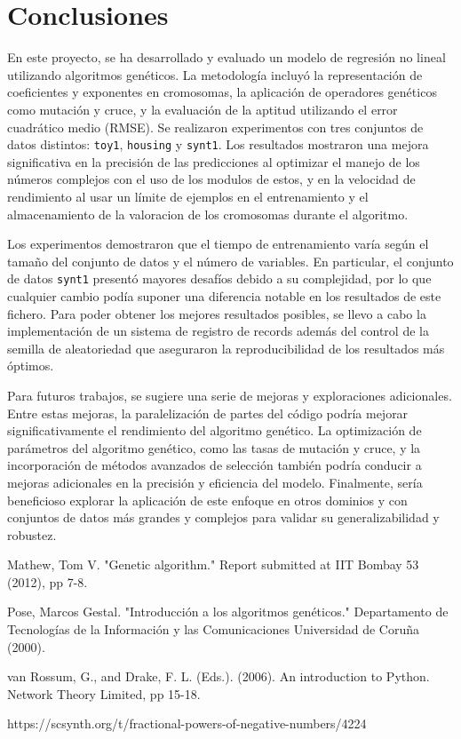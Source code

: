 \documentclass[conference,a4paper]{IEEEtran}
\begin{document}
\section{Conclusiones}

En este proyecto, se ha desarrollado y evaluado un modelo de regresión no lineal utilizando algoritmos genéticos. La metodología incluyó la representación de coeficientes y exponentes en cromosomas, la aplicación de operadores genéticos como mutación y cruce, y la evaluación de la aptitud utilizando el error cuadrático medio (RMSE). Se realizaron experimentos con tres conjuntos de datos distintos: \texttt{toy1}, \texttt{housing} y \texttt{synt1}. Los resultados mostraron una mejora significativa en la precisión de las predicciones al optimizar el manejo de los números complejos con el uso de los modulos de estos, y en la velocidad de rendimiento al usar un límite de ejemplos en el entrenamiento y el almacenamiento de la valoracion de los cromosomas durante el algoritmo.

Los experimentos demostraron que el tiempo de entrenamiento varía según el tamaño del conjunto de datos y el número de variables. En particular, el conjunto de datos \texttt{synt1} presentó mayores desafíos debido a su complejidad, por lo que cualquier cambio podía suponer una diferencia notable en los resultados de este fichero. Para poder obtener los mejores resultados posibles, se llevo a cabo la implementación de un sistema de registro de records además del control de la semilla de aleatoriedad que aseguraron la reproducibilidad de los resultados más óptimos.

Para futuros trabajos, se sugiere una serie de mejoras y exploraciones adicionales. Entre estas mejoras, la paralelización de partes del código podría mejorar significativamente el rendimiento del algoritmo genético. La optimización de parámetros del algoritmo genético, como las tasas de mutación y cruce, y la incorporación de métodos avanzados de selección también podría conducir a mejoras adicionales en la precisión y eficiencia del modelo. Finalmente, sería beneficioso explorar la aplicación de este enfoque en otros dominios y con conjuntos de datos más grandes y complejos para validar su generalizabilidad y robustez.


\begin{thebibliography}{00}
Mathew, Tom V. "Genetic algorithm." Report submitted at IIT Bombay 53 (2012), pp 7-8.

Pose, Marcos Gestal. "Introducción a los algoritmos genéticos." Departamento de Tecnologías de la Información y las Comunicaciones Universidad de Coruña (2000).

van Rossum, G., and Drake, F. L. (Eds.). (2006). An introduction to Python. Network Theory Limited, pp 15-18.

https://scsynth.org/t/fractional-powers-of-negative-numbers/4224
\end{thebibliography}
\end{document}
